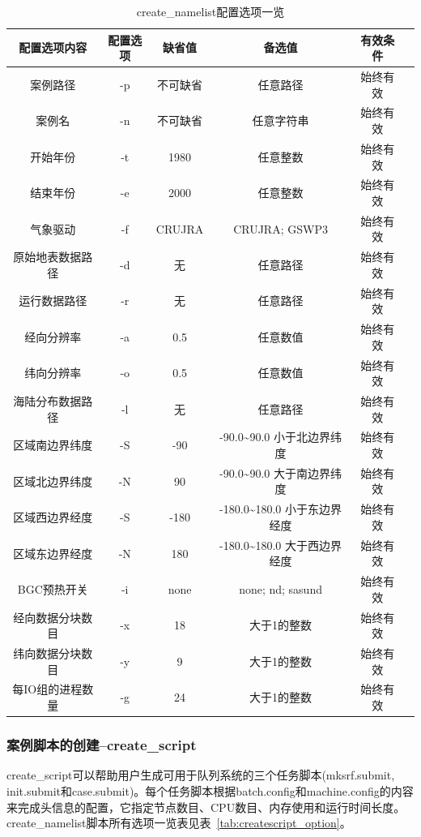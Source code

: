 \begin{table}[!htbp]
\renewcommand{\arraystretch}{1.5}
\centering
\caption{create\_namelist配置选项一览}\label{tab:createnml_option}
\begin{tabular}{
cccccc} \toprule
\textbf{配置选项内容} & \textbf{配置选项} & \textbf{缺省值} & \textbf{备选值} & \textbf{有效条件}\\ \midrule
案例路径 & -p & 不可缺省 & 任意路径 & 始终有效 \\
案例名  & -n & 不可缺省 & 任意字符串 & 始终有效 \\
开始年份 & -t & 1980 & 任意整数 & 始终有效\\
结束年份 & -e & 2000 & 任意整数 & 始终有效\\
气象驱动 & -f & CRUJRA & CRUJRA; GSWP3  & 始终有效\\
原始地表数据路径 & -d & 无 & 任意路径 & 始终有效\\
运行数据路径 & -r & 无 & 任意路径 & 始终有效\\
经向分辨率 & -a & 0.5 & 任意数值 & 始终有效\\
纬向分辨率 & -o & 0.5 & 任意数值 & 始终有效\\
海陆分布数据路径 & -l & 无 & 任意路径 & 始终有效\\
区域南边界纬度 & -S & -90 & -90.0\textasciitilde90.0 小于北边界纬度 & 始终有效\\
区域北边界纬度 & -N & 90 & -90.0\textasciitilde90.0 大于南边界纬度 & 始终有效\\
区域西边界经度 & -S & -180 & -180.0\textasciitilde180.0 小于东边界经度 & 始终有效\\
区域东边界经度 & -N & 180 & -180.0\textasciitilde180.0 大于西边界经度 & 始终有效\\
BGC预热开关 & -i &none & none; nd; sasund& 始终有效 \\
经向数据分块数目 & -x & 18 & 大于1的整数& 始终有效 \\
纬向数据分块数目 & -y & 9 & 大于1的整数& 始终有效 \\
每IO组的进程数量 & -g & 24 & 大于1的整数& 始终有效 \\
\bottomrule
\end{tabular}
\end{table}

\subsubsection{案例脚本的创建--create\_script}

create\_script可以帮助用户生成可用于队列系统的三个任务脚本(mksrf.submit, init.submit和case.submit)。每个任务脚本根据batch.config和machine.config的内容来完成头信息的配置，它指定节点数目、CPU数目、内存使用和运行时间长度。create\_namelist脚本所有选项一览表见表~\ref{tab:createscript_option}。


